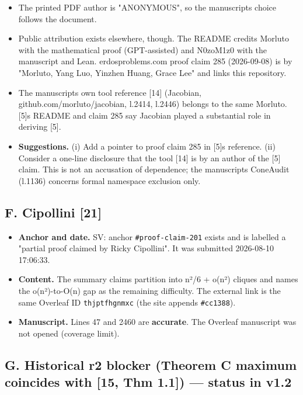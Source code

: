 \documentclass[
]{article}
\providecommand{\tightlist}{%
  \setlength{\itemsep}{0pt}\setlength{\parskip}{0pt}}
\begin{document}
\begin{itemize}
  \begin{itemize}
  \tightlist
  \item
    The printed PDF author is "ANONYMOUS", so the
    manuscript\textquotesingle s choice follows the document.
  \item
    Public attribution exists elsewhere, though. The README credits
    Morluto with the mathematical proof (GPT-assisted) and N0zoM1z0 with
    the manuscript and Lean. erdosproblems.com proof claim 285
    (2026-09-08) is by "Morluto, Yang Luo, Yinzhen Huang, Grace Lee" and
    links this repository.
  \item
    The manuscript\textquotesingle s own tool reference {[}14{]}
    (Jacobian, github.com/morluto/jacobian, l.2414, l.2446) belongs to
    the same Morluto. {[}5{]}\textquotesingle s README and claim 285 say
    Jacobian played a substantial role in deriving {[}5{]}.
  \item
    \textbf{Suggestions.} (i) Add a pointer to proof claim 285 in
    {[}5{]}\textquotesingle s reference. (ii) Consider a one-line
    disclosure that the tool {[}14{]} is by an author of the {[}5{]}
    claim. This is not an accusation of dependence; the
    manuscript\textquotesingle s ConeAudit (l.1136) concerns formal
    namespace exclusion only.
  \end{itemize}
\end{itemize}

\subsection{F. Cipollini {[}21{]}}\label{f-cipollini-21}

\begin{itemize}
\tightlist
\item
  \textbf{Anchor and date.} SV: anchor \texttt{\#proof-claim-201} exists
  and is labelled a "partial proof claimed by Ricky Cipollini". It was
  submitted 2026-08-10 17:06:33.
\item
  \textbf{Content.} The summary claims partition into n²/6 + o(n²)
  cliques and names the o(n²)-to-O(n) gap as the remaining difficulty.
  The external link is the same Overleaf ID \texttt{thjptfhgnmxc} (the
  site appends \texttt{\#cc1388}).
\item
  \textbf{Manuscript.} Lines 47 and 2460 are \textbf{accurate}. The
  Overleaf manuscript was not opened (coverage limit).
\end{itemize}

\subsection{G. Historical r2 blocker (Theorem C maximum coincides with
{[}15, Thm 1.1{]}) --- status in
v1.2}\label{g-historical-r2-blocker-theorem-c-maximum-coincides-with-15-thm-11--status-in-v12}
\end{document}
